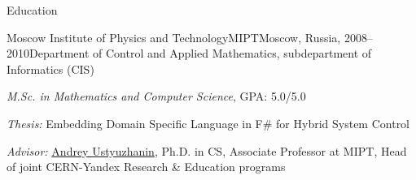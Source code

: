 \documentclass{resume} %
\begin{document}
\begin{rSection}{Education}

\begin{rSubsectionEducation}{Moscow Institute of Physics and Technology}{MIPT}{Moscow,
Russia, 2008--2010}{Department of Control and Applied Mathematics, 
subdepartment of Informatics (CIS)}
\item \textit{M.Sc. in Mathematics and Computer Science}, GPA: 5.0/5.0
\item \textit{Thesis:} Embedding Domain Specific Language in F\# for Hybrid System Control
\item \textit{Advisor:} \href{https://ru.linkedin.com/in/andreyustyuzhanin}{Andrey Ustyuzhanin},
Ph.D. in CS, Associate Professor at MIPT, Head of joint CERN-Yandex Research \& Education programs
\end{rSubsectionEducation}


\end{rSection}
\end{document}
